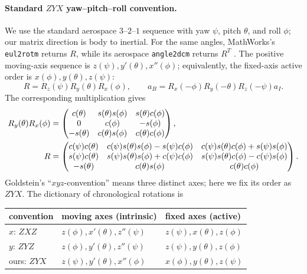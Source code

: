 \paragraph{Standard $ZYX$ yaw--pitch--roll convention.}
We use the standard aerospace $3$--$2$--$1$ sequence with yaw $\psi$,
pitch $\theta$, and roll $\phi$; our matrix direction is body to inertial.
For the same angles, MathWorks's \texttt{eul2rotm} returns $R$, while its
aerospace \texttt{angle2dcm} returns $R^T$
\cite{MathWorksRotationConventions}.
The positive moving-axis
sequence is $z(\psi),y'(\theta),x''(\phi)$; equivalently, the fixed-axis
active order is $x(\phi),y(\theta),z(\psi)$:
\begin{equation}\label{gnc:zyx-angles}
 R=R_z(\psi)R_y(\theta)R_x(\phi),\qquad
 a_B=R_x(-\phi)R_y(-\theta)R_z(-\psi)a_I.
\end{equation}
The corresponding multiplication gives
\begin{align}
 R_y(\theta)R_x(\phi)
 &=\begin{pmatrix}
 c(\theta)&s(\theta)s(\phi)&s(\theta)c(\phi)\\
 0&c(\phi)&-s(\phi)\\
 -s(\theta)&c(\theta)s(\phi)&c(\theta)c(\phi)
 \end{pmatrix},\notag\\
 R&=\begin{pmatrix}
 c(\psi)c(\theta)&c(\psi)s(\theta)s(\phi)-s(\psi)c(\phi)&
 c(\psi)s(\theta)c(\phi)+s(\psi)s(\phi)\\
 s(\psi)c(\theta)&s(\psi)s(\theta)s(\phi)+c(\psi)c(\phi)&
 s(\psi)s(\theta)c(\phi)-c(\psi)s(\phi)\\
 -s(\theta)&c(\theta)s(\phi)&c(\theta)c(\phi)
 \end{pmatrix}.\label{gnc:zyx-expanded}
\end{align}
Goldstein's ``$xyz$-convention'' means three distinct axes; here we fix
its order as $ZYX$. The dictionary of chronological rotations is
\begin{center}
\begin{tabular}{@{}lll@{}}
 convention & moving axes (intrinsic) & fixed axes (active)\\\hline
 $x$: $ZXZ$ & $z(\phi),x'(\theta),z''(\psi)$ & $z(\psi),x(\theta),z(\phi)$\\
 $y$: $ZYZ$ & $z(\phi),y'(\theta),z''(\psi)$ & $z(\psi),y(\theta),z(\phi)$\\
 ours: $ZYX$ & $z(\psi),y'(\theta),x''(\phi)$ & $x(\phi),y(\theta),z(\psi)$
\end{tabular}
\end{center}
